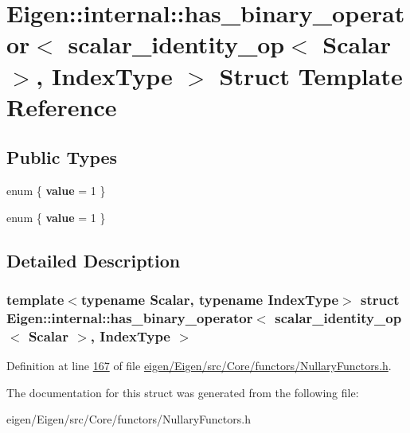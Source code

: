 \hypertarget{struct_eigen_1_1internal_1_1has__binary__operator_3_01scalar__identity__op_3_01_scalar_01_4_00_01_index_type_01_4}{}\section{Eigen\+:\+:internal\+:\+:has\+\_\+binary\+\_\+operator$<$ scalar\+\_\+identity\+\_\+op$<$ Scalar $>$, Index\+Type $>$ Struct Template Reference}
\label{struct_eigen_1_1internal_1_1has__binary__operator_3_01scalar__identity__op_3_01_scalar_01_4_00_01_index_type_01_4}
\subsection*{Public Types}
\begin{DoxyCompactItemize}
\item 
\mbox{\label{struct_eigen_1_1internal_1_1has__binary__operator_3_01scalar__identity__op_3_01_scalar_01_4_00_01_index_type_01_4_a400ef9822c1f1f3c520980d6ae9c4e9a}} 
enum \{ {\bfseries value} = 1
 \}
\item 
\mbox{\label{struct_eigen_1_1internal_1_1has__binary__operator_3_01scalar__identity__op_3_01_scalar_01_4_00_01_index_type_01_4_a09129213aefc5d4bba4005ead8b71289}} 
enum \{ {\bfseries value} = 1
 \}
\end{DoxyCompactItemize}


\subsection{Detailed Description}
\subsubsection*{template$<$typename Scalar, typename Index\+Type$>$\newline
struct Eigen\+::internal\+::has\+\_\+binary\+\_\+operator$<$ scalar\+\_\+identity\+\_\+op$<$ Scalar $>$, Index\+Type $>$}



Definition at line \hyperlink{eigen_2_eigen_2src_2_core_2functors_2_nullary_functors_8h_source_l00167}{167} of file \hyperlink{eigen_2_eigen_2src_2_core_2functors_2_nullary_functors_8h_source}{eigen/\+Eigen/src/\+Core/functors/\+Nullary\+Functors.\+h}.



The documentation for this struct was generated from the following file\+:\begin{DoxyCompactItemize}
\item 
eigen/\+Eigen/src/\+Core/functors/\+Nullary\+Functors.\+h\end{DoxyCompactItemize}
